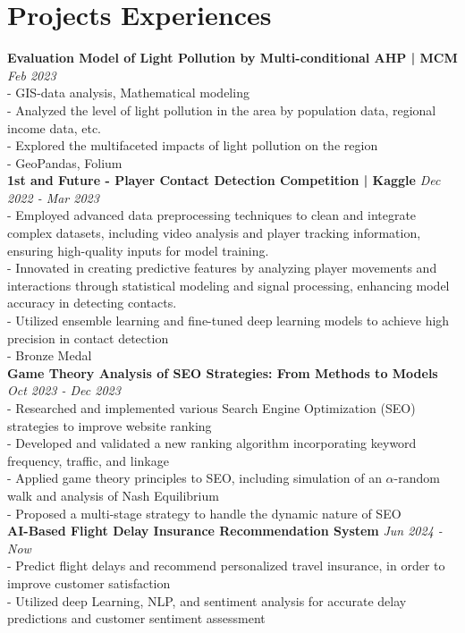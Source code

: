 \documentclass[a4paper,10pt]{article}
\begin{document}
\section*{Projects Experiences}
\textbf{Evaluation Model of Light Pollution by Multi-conditional AHP | MCM} \hfill \textit{Feb 2023}\\
- GIS-data analysis, Mathematical modeling\\
- Analyzed the level of light pollution in the area by population data, regional income data, etc.\\
- Explored the multifaceted impacts of light pollution on the region\\
- GeoPandas, Folium\\
\textbf{1st and Future - Player Contact Detection Competition | Kaggle} \hfill \textit{Dec 2022 - Mar 2023}\\
- Employed advanced data preprocessing techniques to clean and integrate complex datasets, including video analysis and player tracking information, ensuring high-quality inputs for model training.\\
- Innovated in creating predictive features by analyzing player movements and interactions through statistical modeling and signal processing, enhancing model accuracy in detecting contacts.\\
- Utilized ensemble learning and fine-tuned deep learning models to achieve high precision in contact detection\\
- Bronze Medal\\
\textbf{Game Theory Analysis of SEO Strategies: From Methods to Models} \hfill \textit{Oct 2023 - Dec 2023}\\
- Researched and implemented various Search Engine Optimization (SEO) strategies to improve website ranking\\
- Developed and validated a new ranking algorithm incorporating keyword frequency, traffic, and linkage\\
- Applied game theory principles to SEO, including simulation of an $\alpha$-random walk and analysis of Nash Equilibrium\\
- Proposed a multi-stage strategy to handle the dynamic nature of SEO\\
\textbf{AI-Based Flight Delay  Insurance Recommendation System} \hfill \textit{Jun 2024 - Now}\\
- Predict flight delays and recommend personalized travel insurance, in order to improve customer satisfaction\\
- Utilized deep Learning, NLP, and sentiment analysis for accurate delay predictions and customer sentiment assessment\\
\end{document}
